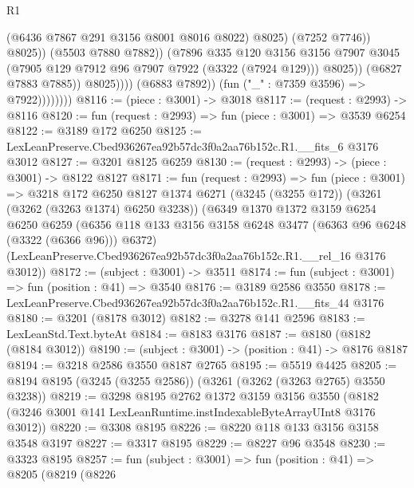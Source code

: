 \begin{lexlean}{R1}
\begin{coremodule}
                                          (@6436 @7867 @291 @3156 @8001 @8016 @8022)
                                          @8025)
                                        (@7252 @7746))
                                      @8025))
                                  (@5503 @7880 @7882))
                                (@7896
                                  @335
                                  @120
                                  @3156
                                  @3156
                                  @7907
                                  @3045
                                  (@7905 @129 @7912 @96 @7907 @7922 (@3322 (@7924 @129)))
                                  @8025))
                              (@6827 @7883 @7885))
                            @8025))))
                    (@6883 @7892))
                  (fun ("_" : @7359 @3596) => @7922))))))))
@8116 := (piece : @3001) -> @3018
@8117 := (request : @2993) -> @8116
@8120 := fun (request : @2993) => fun (piece : @3001) => @3539 @6254
@8122 := @3189 @172 @6250
@8125 := LexLeanPreserve.Cbed936267ea92b57dc3f0a2aa76b152c.R1.__fits_6 @3176 @3012
@8127 := @3201 @8125 @6259
@8130 := (request : @2993) -> (piece : @3001) -> @8122 @8127
@8171 := fun (request : @2993) =>
  fun (piece : @3001) =>
  @3218
    @172
    @6250
    @8127
    @1374
    @6271
    (@3245 (@3255 @172))
    (@3261 (@3262 (@3263 @1374) @6250 @3238))
    (@6349
      @1370
      @1372
      @3159
      @6254
      @6250
      @6259
      (@6356 @118 @133 @3156 @3158 @6248 @3477 (@6363 @96 @6248 (@3322 (@6366 @96))) @6372)
      (LexLeanPreserve.Cbed936267ea92b57dc3f0a2aa76b152c.R1.__rel_16 @3176 @3012))
@8172 := (subject : @3001) -> @3511
@8174 := fun (subject : @3001) => fun (position : @41) => @3540
@8176 := @3189 @2586 @3550
@8178 := LexLeanPreserve.Cbed936267ea92b57dc3f0a2aa76b152c.R1.__fits_44 @3176
@8180 := @3201 (@8178 @3012)
@8182 := @3278 @141 @2596
@8183 := LexLeanStd.Text.byteAt
@8184 := @8183 @3176
@8187 := @8180 (@8182 (@8184 @3012))
@8190 := (subject : @3001) -> (position : @41) -> @8176 @8187
@8194 := @3218 @2586 @3550 @8187 @2765
@8195 := @5519 @4425
@8205 := @8194 @8195 (@3245 (@3255 @2586)) (@3261 (@3262 (@3263 @2765) @3550 @3238))
@8219 := @3298
    @8195
    @2762
    @1372
    @3159
    @3156
    @3550
    (@8182 (@3246 @3001 @141 LexLeanRuntime.instIndexableByteArrayUInt8 @3176 @3012))
@8220 := @3308 @8195
@8226 := @8220 @118 @133 @3156 @3158 @3548 @3197
@8227 := @3317 @8195
@8229 := @8227 @96 @3548
@8230 := @3323 @8195
@8257 := fun (subject : @3001) =>
  fun (position : @41) =>
  @8205
    (@8219
      (@8226

\end{coremodule}
\end{lexlean}
